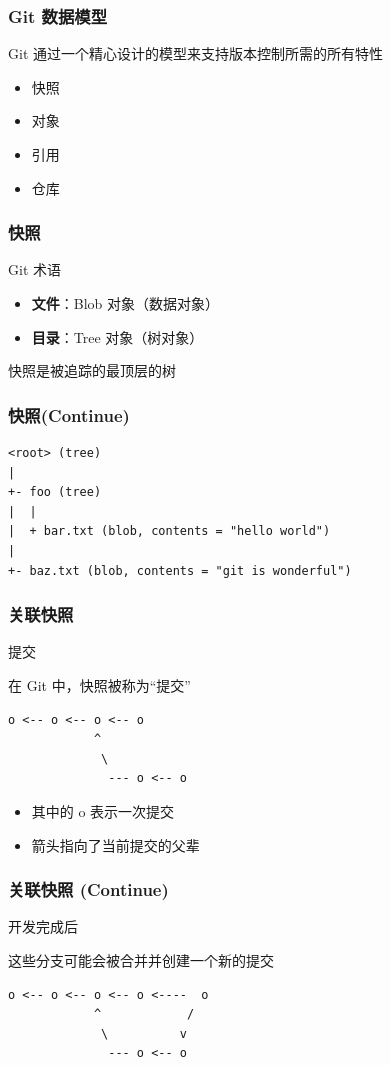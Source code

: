 \documentclass[UTF8, 16pt]{beamer}
\begin{document}
\begin{frame}
    \frametitle{Git 数据模型}
    \textcolor{sufered}{Git 通过一个精心设计的模型来支持版本控制所需的所有特性}
    \begin{itemize}
        \item 快照
        \item 对象
        \item 引用
        \item 仓库
    \end{itemize}
\end{frame}

\begin{frame}
    \frametitle{快照}
    \textcolor{sufered}{Git 术语}
    \begin{itemize}
        \item \textbf{文件}：Blob 对象（数据对象）
        \item \textbf{目录}：Tree 对象（树对象）
    \end{itemize}

    \textcolor{sufered}{快照是被追踪的最顶层的树}
\end{frame}

\begin{frame}[fragile]
    \frametitle{快照(Continue)}
    \begin{lstlisting}
<root> (tree)
|
+- foo (tree)
|  |
|  + bar.txt (blob, contents = "hello world")
|
+- baz.txt (blob, contents = "git is wonderful")
    \end{lstlisting}
\end{frame}

\begin{frame}[fragile]
    \frametitle{关联快照}
    \textcolor{sufered}{提交}

    在 Git 中，快照被称为“提交”

    \begin{lstlisting}
o <-- o <-- o <-- o
            ^
             \
              --- o <-- o
    \end{lstlisting}

    \begin{itemize}
        \item 其中的 o 表示一次提交
        \item 箭头指向了当前提交的父辈
    \end{itemize}
    
\end{frame}

\begin{frame}[fragile]
    \frametitle{关联快照 (Continue)}

    \textcolor{sufered}{开发完成后}

    这些分支可能会被合并并创建一个新的提交
    
    \begin{lstlisting}
o <-- o <-- o <-- o <----  o 
            ^            /
             \          v
              --- o <-- o
    \end{lstlisting}
\end{frame}
\end{document}
